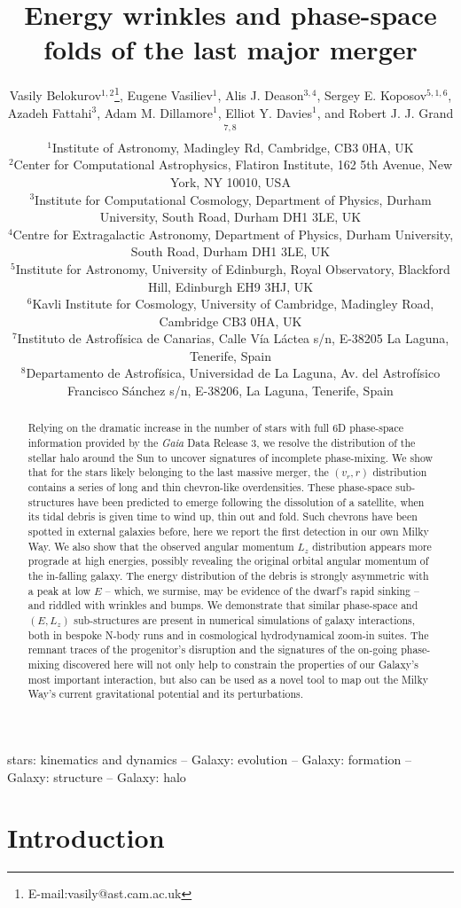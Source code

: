 \documentclass[a4paper,useAMS,usenatbib]{mnras}
\title[Energy wrinkles and phase-space folds]{Energy wrinkles and phase-space folds of the last major merger}
\author[Belokurov et al]{Vasily  Belokurov$^{1,2}$\thanks{E-mail:vasily@ast.cam.ac.uk}, Eugene Vasiliev$^{1}$, Alis J. Deason$^{3,4}$, Sergey E. Koposov$^{5,1,6}$, \newauthor Azadeh Fattahi$^{3}$, Adam M. Dillamore$^{1}$, Elliot Y. Davies$^{1}$, and Robert J. J. Grand$^{7,8}$\\
$^1$Institute of Astronomy, Madingley Rd, Cambridge, CB3 0HA, UK\\ 
$^2$Center for Computational Astrophysics, Flatiron Institute, 162 5th Avenue, New York, NY 10010, USA\\
$^{3}$Institute for Computational Cosmology, Department of Physics, Durham University, South Road, Durham DH1 3LE, UK\\
$^{4}$Centre for Extragalactic Astronomy, Department of Physics, Durham University, South Road, Durham DH1 3LE, UK\\
$^{5}$Institute for Astronomy, University of Edinburgh, Royal Observatory, Blackford Hill, Edinburgh EH9 3HJ, UK\\
$^{6}$Kavli Institute for Cosmology, University of Cambridge, Madingley Road, Cambridge CB3 0HA, UK\\
$^7$Instituto de Astrof\'isica de Canarias, Calle Vía L\'actea s/n, E-38205 La Laguna, Tenerife, Spain\\
$^8$Departamento de Astrof\'isica, Universidad de La Laguna, Av. del Astrof\'isico Francisco S\'anchez s/n, E-38206, La Laguna, Tenerife, Spain
}
\begin{document}

\maketitle

\label{firstpage}

\begin{abstract}
Relying on the dramatic increase in the number of stars with full 6D phase-space information provided by the {\it Gaia} Data Release 3, we resolve the distribution of the stellar halo around the Sun to uncover signatures of incomplete phase-mixing. We show that for the stars likely belonging to the last massive merger, the $(v_r,r)$ distribution contains a series of long and thin chevron-like overdensities. These phase-space sub-structures have been predicted to emerge following the dissolution of a satellite, when its tidal debris is given time to wind up, thin out and fold. Such chevrons have been spotted in external galaxies before, here we report the first detection in our own Milky Way. We also show that the observed angular momentum $L_z$ distribution appears more prograde at high energies, possibly revealing the original orbital angular momentum of the in-falling galaxy. The energy distribution of the debris is strongly asymmetric with a peak at low $E$ -- which, we surmise, may be evidence of the dwarf's rapid sinking -- and riddled with wrinkles and bumps.  We demonstrate that similar phase-space and $(E,L_z)$ sub-structures are present in numerical simulations of galaxy interactions, both in bespoke N-body runs and in cosmological hydrodynamical zoom-in suites. The remnant traces of the progenitor's disruption and the signatures of the on-going phase-mixing discovered here will not only help to constrain the properties of our Galaxy's most important interaction, but also can be used as a novel tool to map out the Milky Way's current gravitational potential and its perturbations.

\end{abstract}

\begin{keywords}
stars: kinematics and dynamics -- Galaxy: evolution -- Galaxy: formation  -- Galaxy: structure -- Galaxy: halo 
\end{keywords}

\section{Introduction}
\end{document}
